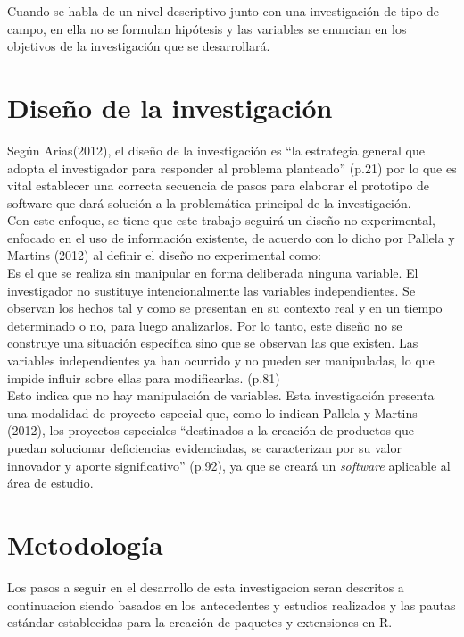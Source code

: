 	Cuando se habla de un nivel descriptivo junto con una investigaci\'on de tipo de campo, en ella no se formulan hip\'otesis y las variables se enuncian en los objetivos de la investigaci\'on que se desarrollar\'a.
	
\section{Dise\~no de la investigaci\'on}
	
Seg\'un Arias(2012), el dise\~no de la investigaci\'on es “la estrategia general que adopta el investigador para responder al problema planteado” (p.21) por lo que es vital establecer una correcta secuencia de pasos para elaborar el prototipo de software que dar\'a soluci\'on a la problem\'atica principal de la investigaci\'on.\\

Con este enfoque, se tiene que este trabajo seguir\'a un dise\~no no experimental, enfocado en el uso de informaci\'on existente, de acuerdo con lo dicho por Pallela y  Martins (2012) al definir el dise\~no no experimental como:\\

Es el que se realiza sin manipular en forma deliberada ninguna variable. El investigador no sustituye intencionalmente las variables independientes. Se observan los hechos tal y como se presentan en su contexto real y en un tiempo determinado o no, para luego analizarlos. Por lo tanto, este dise\~no no se construye una situaci\'on espec\'ifica sino que se observan las que existen. Las variables independientes ya han ocurrido y no pueden ser manipuladas, lo que impide influir sobre ellas para modificarlas. (p.81)\\

Esto indica que no hay manipulaci\'on de variables. Esta investigaci\'on presenta una modalidad de proyecto especial que, como lo indican Pallela y  Martins (2012), los proyectos especiales “destinados a la creaci\'on de productos que puedan solucionar deficiencias evidenciadas, se caracterizan por su valor innovador y aporte significativo” (p.92), ya que se crear\'a un \emph{software} aplicable al \'area de estudio.\\

\section{Metodolog\'ia}

Los pasos a seguir en el desarrollo de esta investigacion seran descritos a continuacion siendo basados en los antecedentes y estudios realizados y las pautas est\'andar establecidas para la creación de paquetes y extensiones en R.\\

